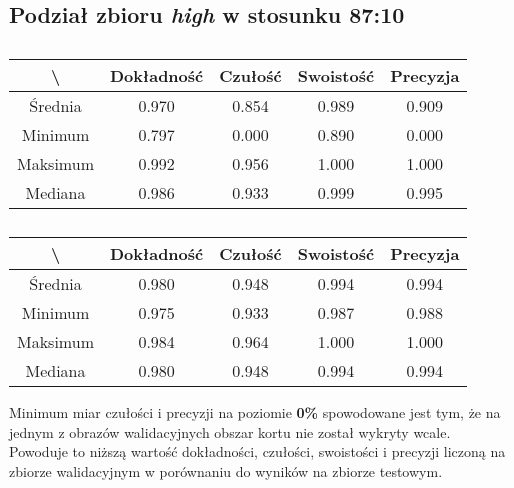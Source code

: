 \subsection{Podział zbioru \textit{high} w stosunku 87:10}
\label{sec:highsplitb}


\begin{table}[H]
	\centering
	\caption{}
	\vspace{6pt}
	{\footnotesize
		\begin{tabular}{|c|c|c|c|c|}
      \hline \textbackslash & Dokładność & Czułość & Swoistość & Precyzja \\
      \hline Średnia & 0.970 & 0.854 & 0.989 & 0.909 \\
      \hline Minimum & 0.797 & 0.000 & 0.890 & 0.000 \\
      \hline Maksimum & 0.992 & 0.956 & 1.000 & 1.000 \\
      \hline Mediana & 0.986 & 0.933 & 0.999 & 0.995 \\
      \hline
    \end{tabular}
    \label{Tab:highsplitb_val}
	}
	\vspace{0pt}
\end{table}

\begin{table}[H]
	\centering
	\caption{}
	\vspace{6pt}
	{\footnotesize
		\begin{tabular}{|c|c|c|c|c|}
      \hline \textbackslash & Dokładność & Czułość & Swoistość & Precyzja \\
      \hline Średnia & 0.980 & 0.948 & 0.994 & 0.994 \\
      \hline Minimum & 0.975 & 0.933 & 0.987 & 0.988 \\
      \hline Maksimum & 0.984 & 0.964 & 1.000 & 1.000 \\
      \hline Mediana & 0.980 & 0.948 & 0.994 & 0.994 \\
      \hline
    \end{tabular}
    \label{Tab:highsplitb_test}
	}
	\vspace{0pt}
\end{table}

Minimum miar czułości i precyzji na poziomie \textbf{0\%} spowodowane jest tym, że na jednym z obrazów walidacyjnych obszar kortu nie został wykryty wcale. Powoduje to niższą wartość dokładności, czułości, swoistości i precyzji liczoną na zbiorze walidacyjnym w porównaniu do wyników na zbiorze testowym.
